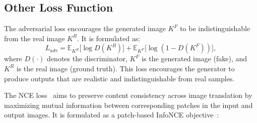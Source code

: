 \documentclass[journal,twoside,web]{ieeecolor}
\begin{document}




\subsection{Other Loss Function}
{
The adversarial loss encourages the generated image $K^F$ to be indistinguishable from the real image $K^R$. It is formulated as:}
{
\begin{equation}
{L}_{{adv}} = 
\mathbb{E}_{K^R} \big[\log D(K^R) \big] +
\mathbb{E}_{K^F} \big[\log (1 - D(K^F)) \big],
\end{equation}
}
{where $D(\cdot)$ denotes the discriminator, $K^F$ is the generated image (fake), and $K^R$ is the real image (ground truth). This loss encourages the generator to produce outputs that are realistic and indistinguishable from real samples.}



{
The NCE loss~\cite{oord2018representation,park2020contrastive} aims to preserve content consistency across image translation by maximizing mutual information between corresponding patches in the input and output images. It is formulated as a patch-based InfoNCE objective~\cite{oord2018representation}:}
\end{document}
